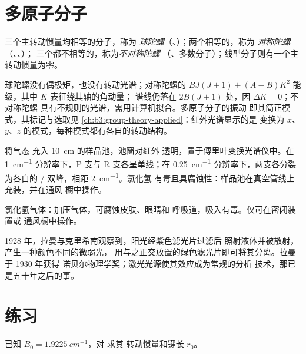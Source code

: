 \section{多原子分子}

\begin{definition}[转子的类型]\label{def:b3:rovibrational-spectroscopy:rotor-types}
三个主转动惯量均相等的分子，称为
\emph{球陀螺}（、）；两个相等的，称为
\emph{对称陀螺}（、、）；
三个都不相等的，称为\emph{不对称陀螺}
（、多数分子）；线型分子则有一个主转动惯量为零。
\end{definition}

球陀螺没有偶极矩，也没有转动光谱；对称陀螺的
$BJ(J+1) + (A - B)K^2$ 能级，其中 $K$ 表征绕其轴的角动量；
谱线仍落在 $2B(J+1)$ 处，因 $\Delta K = 0$；不对称陀螺
具有不规则的光谱，需用计算机拟合。多原子分子的振动
即其简正模式，其标记与选取见
\cref{ch:b3:group-theory-applied}：红外光谱显示的是
变换为 $x$、$y$、$z$ 的模式，每种模式都有各自的转动结构。

\begin{inthelab}[红外光谱仪中的气体样品池]
将气态  充入 \qty{10}{cm} 的样品池，池窗对红外
透明，置于傅里叶变换光谱仪中。在 \qty{1}{cm^{-1}}
分辨率下，P 支与 R 支各呈单线；在 \qty{0.25}{cm^{-1}}
分辨率下，两支各分裂为各自的 / 双峰，相距 \qty{2}{cm^{-1}}。氯化氢
有毒且具腐蚀性：样品池在真空管线上充装，并在通风
橱中操作。
\end{inthelab}

\begin{safety}{}
氯化氢气体：加压气体，可腐蚀皮肤、眼睛和
呼吸道，吸入有毒。仅可在密闭装置或
通风橱中操作。
\end{safety}

\begin{history}[拉曼，1928 年]
1928 年，拉曼与克里希南观察到，阳光经紫色滤光片过滤后
照射液体并被散射，产生一种颜色不同的微弱光，
用与之正交放置的绿色滤光片即可将其分离。拉曼于 1930 年获得
诺贝尔物理学奖；激光光源使其效应成为常规的分析
技术，那已是五十年之后的事。
\end{history}

\section{练习}

\begin{exercise}[$\star$]\label{exo:b3:rovibrational-spectroscopy:1}
已知 $B_0 = \qty{1.9225}{cm^{-1}}$，对  求其
转动惯量和键长 $r_0$。
\end{exercise}

